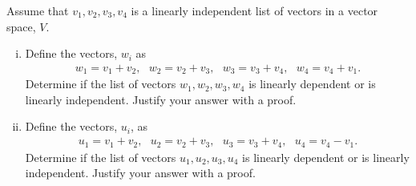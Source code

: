 \begin{question}
	\normalfont
	
		
	\noindent Assume that \hspace{.1cm} $v_1, v_2, v_3, v_4$ \hspace{.1cm} is a linearly independent list of vectors in a vector space, $V$.
	
	\begin{enumerate}[(i)]
		\item Define the vectors, $w_i$ as
		\begin{align*}
			w_1 = v_1 + v_2,\ \ \ 
			w_2 = v_2 + v_3,\ \ \ 
			w_3 = v_3 + v_4,\ \ \
			w_4 = v_4 + v_1.
		\end{align*}
		Determine if the list of vectors \hspace{.1cm} $w_1, w_2, w_3, w_4$ \hspace{.1cm} is linearly dependent or is linearly independent. Justify your answer with a proof.		
		\item Define the vectors, $u_i$, as
		\begin{align*}
			u_1 = v_1 + v_2,\ \ \ 
			u_2 = v_2 + v_3,\ \ \ 
			u_3 = v_3 + v_4,\ \ \
			u_4 = v_4 - v_1.
		\end{align*}
		Determine if the list of vectors \hspace{.1cm}  $ u_1, u_2, u_3, u_4 $  \hspace{.1cm} is linearly dependent or is linearly independent.  Justify your answer with a proof.	
	\end{enumerate}
\end{question}

